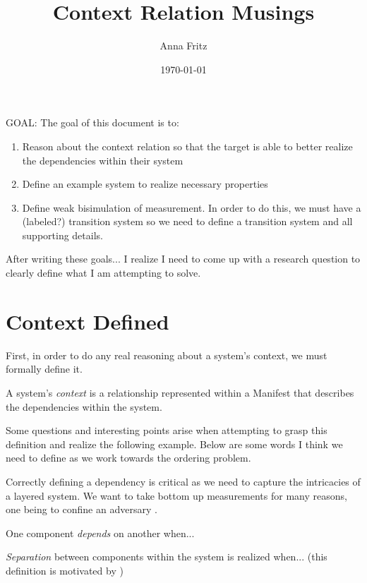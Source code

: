 \documentclass[12pt, letterpaper]{article}
\title{Context Relation Musings}
\author{Anna Fritz}
\date{\today}
\newcommand{\squash}{\itemsep=0pt\parskip=0pt}
\begin{document}
\maketitle

GOAL: The goal of this document is to: 
\begin{enumerate}
  \squash
  \item Reason about the context relation so that the target is able to better realize the dependencies within their system
  \item Define an example system to realize necessary properties
  \item Define weak bisimulation of measurement. In order to do this, we must have a (labeled?) transition system so we need to define a transition system and all supporting details. 
\end{enumerate}

After writing these goals... I realize I need to come up with a research question to clearly define what I am attempting to solve. 

\tableofcontents

\section{Context Defined}

First, in order to do any real reasoning about a system's context, we must formally define it. 

\begin{defn}[Context]
  A system's \emph{context} is a relationship represented within a Manifest that describes the dependencies within the system. 
\end{defn}

Some questions and interesting points arise when attempting to grasp this definition and realize the following example. Below are some words I think we need to define as we work towards the ordering problem. 

Correctly defining a dependency is critical as we need to capture the intricacies of a layered system. We want to take bottom up measurements for many reasons, one being to confine an adversary \cite{Rowe::Bundling}.

\begin{defn}[Dependency] 
  One component \emph{depends} on another when... 
\end{defn}

\begin{defn}[Separation] 
  \emph{Separation} between components within the system is realized when... (this definition is motivated by \cite{Ramsdell::Orchestrating} )
\end{defn}
\end{document}
